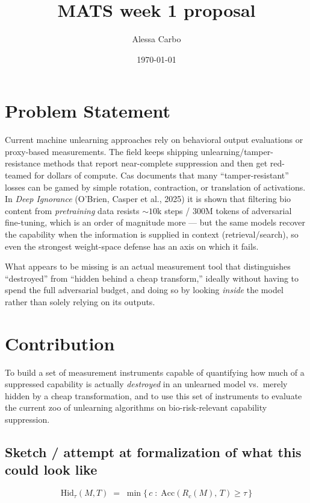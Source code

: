 \documentclass[11pt]{article}
\title{MATS week 1 proposal}
\author{Alessa Carbo}
\date{\today}
\begin{document}
\maketitle



\section*{Problem Statement}

Current machine unlearning approaches rely on behavioral output evaluations or
proxy-based measurements. The field keeps shipping unlearning/tamper-resistance
methods that report near-complete suppression and then get red-teamed for
dollars of compute. Cas documents that many
``tamper-resistant'' losses can be gamed by simple rotation, contraction, or
translation of activations. In \emph{Deep Ignorance} (O'Brien, Casper et al.,
2025) it is shown that filtering bio content from \emph{pretraining} data
resists ${\sim}10\text{k}$ steps / 300M tokens of adversarial fine-tuning, which
is an order of magnitude more --- but the same models recover the capability
when the information is supplied in context (retrieval/search), so even the
strongest weight-space defense has an axis on which it fails.

What appears to be missing is an actual measurement tool that distinguishes
``destroyed'' from ``hidden behind a cheap transform,'' ideally without having
to spend the full adversarial budget, and doing so by looking \emph{inside} the
model rather than solely relying on its outputs.

\section*{Contribution}

To build a set of measurement instruments capable of quantifying how much of a
suppressed capability is actually \emph{destroyed} in an unlearned model vs.\
merely hidden by a cheap transformation, and to use this set of instruments to
evaluate the current zoo of unlearning algorithms on bio-risk-relevant
capability suppression.

\subsection*{Sketch / attempt at formalization of what this could look like}

\[
  \mathrm{Hid}_\tau(M, T) \;=\; \min\bigl\{\, c \;:\; \mathrm{Acc}\!\left(R_c(M),\, T\right) \ge \tau \,\bigr\}
\]
\end{document}
